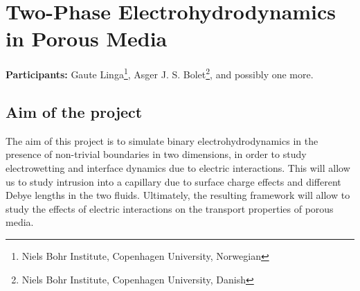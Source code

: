 \documentclass[a4paper,10pt]{article}
\begin{document}
\section*{Two-Phase Electrohydrodynamics in Porous Media}
\textbf{Participants:} Gaute Linga\footnote{Niels Bohr Institute, Copenhagen University, Norwegian}, Asger J. S. Bolet\footnote{Niels Bohr Institute, Copenhagen University, Danish}, and possibly one more.

\subsection*{Aim of the project}
The aim of this project is to simulate binary electrohydrodynamics in the presence of non-trivial boundaries in two dimensions, in order to study electrowetting and interface dynamics due to electric interactions.
This will allow us to study intrusion into a capillary due to surface charge effects and different Debye lengths in the two fluids.
Ultimately, the resulting framework will allow to study the effects of electric interactions on the transport properties of porous media.
\end{document}
